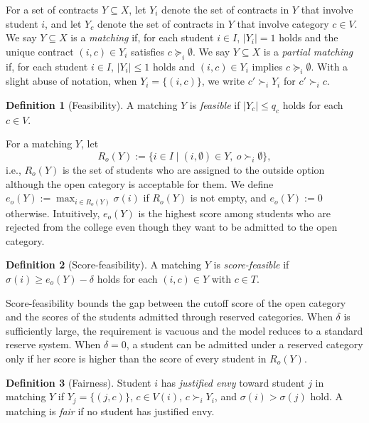 \documentclass[a4paper,twoside]{article}
\theoremstyle{definition}
\newtheorem{definition}{Definition}
\begin{document}
For a set of contracts $Y\subseteq X$, let $Y_i$ denote the set of contracts in $Y$ that
involve student $i$, and let $Y_c$ denote the set of contracts in $Y$ that involve
category $c\in V$.
We say $Y\subseteq X$ is a \emph{matching} if, for each student $i\in I$, $|Y_i|=1$
holds and the unique contract $(i,c)\in Y_i$ satisfies $c\succeq_i\emptyset$.
We say $Y\subseteq X$ is a \emph{partial matching} if, for each student $i\in I$,
$|Y_i|\le 1$ holds and $(i,c)\in Y_i$ implies $c\succeq_i\emptyset$.
With a slight abuse of notation, when $Y_i=\{(i,c)\}$, we write $c'\succ_i Y_i$ for
$c'\succ_i c$.

\begin{definition}[Feasibility]
\label{def:feasibility}
A matching $Y$ is \emph{feasible} if $|Y_c|\le q_c$ holds for each $c\in V$.
\end{definition}

For a matching $Y$, let
\begin{equation}
\label{eq:Ro}
R_o(Y):=\{i\in I\mid (i,\emptyset)\in Y,\ o\succ_i\emptyset\},
\end{equation}
i.e., $R_o(Y)$ is the set of students who are assigned to the outside option although
the open category is acceptable for them.
We define $e_o(Y):=\max_{i\in R_o(Y)}\sigma(i)$ if $R_o(Y)$ is not empty, and
$e_o(Y):=0$ otherwise.
Intuitively, $e_o(Y)$ is the highest score among students who are rejected from the college
even though they want to be admitted to the open category.

\begin{definition}[Score-feasibility]
\label{def:sf}
A matching $Y$ is \emph{score-feasible} if $\sigma(i)\ge e_o(Y)-\delta$ holds for each
$(i,c)\in Y$ with $c\in T$.
\end{definition}

Score-feasibility bounds the gap between the cutoff score of the open category and the
scores of the students admitted through reserved categories.
When $\delta$ is sufficiently large, the requirement is vacuous and the model reduces to a
standard reserve system.
When $\delta=0$, a student can be admitted under a reserved category only if her score is higher than
the score of every student in $R_o(Y)$.

\begin{definition}[Fairness]
\label{def:fair}
Student $i$ has \emph{justified envy} toward student $j$ in matching $Y$ if
$Y_j=\{(j,c)\}$, $c\in V(i)$, $c\succ_i Y_i$, and $\sigma(i)>\sigma(j)$ hold.
A matching is \emph{fair} if no student has justified envy.
\end{definition}
\end{document}
